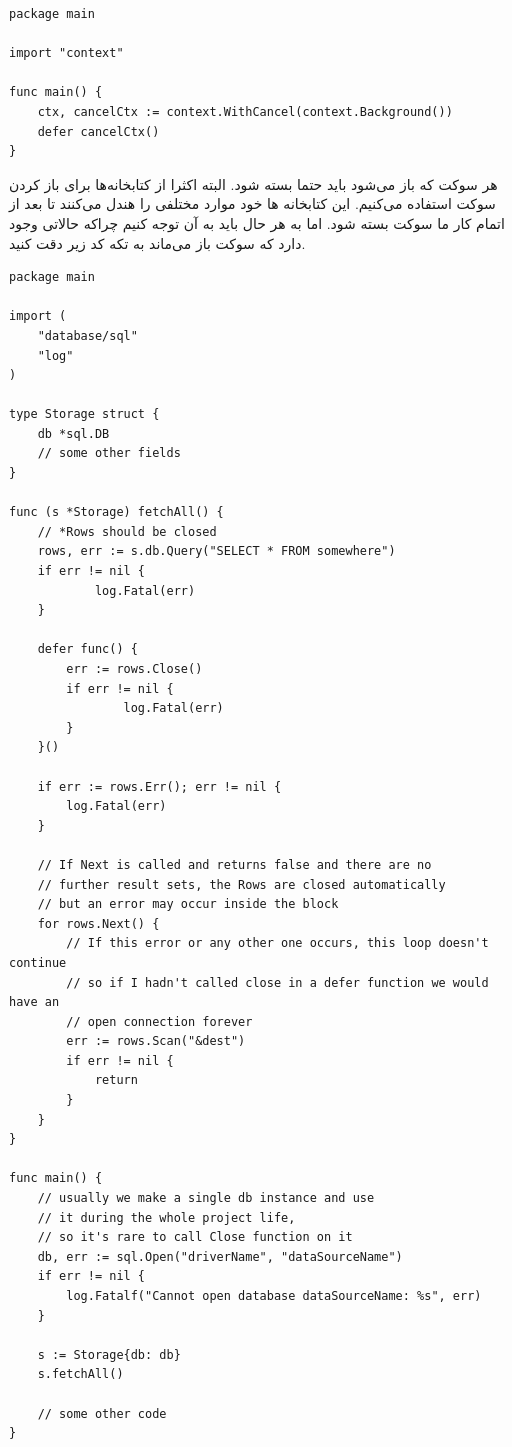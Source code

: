 \documentclass[a4]{report}
\begin{document}
\begin{latin}
\begin{verbatim}
package main

import "context"

func main() {
    ctx, cancelCtx := context.WithCancel(context.Background())
    defer cancelCtx()
}
\end{verbatim}
\end{latin}

هر سوکت که باز می‌شود باید حتما بسته شود. البته اکثرا از کتابخانه‌ها برای باز کردن سوکت استفاده می‌کنیم. این کتابخانه ها خود موارد مختلفی را هندل می‌کنند تا بعد از اتمام کار ما سوکت بسته شود.
اما به هر حال باید به آن توجه کنیم چراکه حالاتی وجود دارد که سوکت باز می‌ماند به تکه کد زیر دقت کنید.

\begin{latin}
\begin{verbatim}
package main

import (
    "database/sql"
    "log"
)

type Storage struct {
    db *sql.DB
    // some other fields
}

func (s *Storage) fetchAll() {
    // *Rows should be closed
    rows, err := s.db.Query("SELECT * FROM somewhere")
    if err != nil {
            log.Fatal(err)
    }

    defer func() {
        err := rows.Close()
        if err != nil {
                log.Fatal(err)
        }
    }()

    if err := rows.Err(); err != nil {
        log.Fatal(err)
    }

    // If Next is called and returns false and there are no
    // further result sets, the Rows are closed automatically
    // but an error may occur inside the block
    for rows.Next() {
        // If this error or any other one occurs, this loop doesn't continue
        // so if I hadn't called close in a defer function we would have an
        // open connection forever
        err := rows.Scan("&dest")
        if err != nil {
            return
        }
    }
}

func main() {
    // usually we make a single db instance and use
    // it during the whole project life,
    // so it's rare to call Close function on it
    db, err := sql.Open("driverName", "dataSourceName")
    if err != nil {
        log.Fatalf("Cannot open database dataSourceName: %s", err)
    }

    s := Storage{db: db}
    s.fetchAll()

    // some other code
}
\end{verbatim}
\end{latin}
\end{document}
